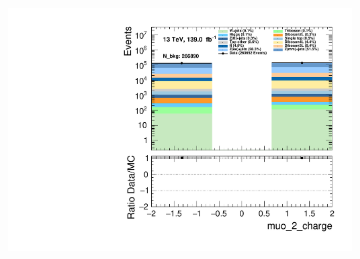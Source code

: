 \begin{figure}
\begin{subfigure}{.49\textwidth}
        \includegraphics[width=\textwidth]{Figures/MC_Data_comp/muo_2_charge.pdf}
        \caption{ }
        \label{fig:fep}
    \end{subfigure}
    \hfill
    
         
    \caption{}
    \label{fig:t}
\end{figure}